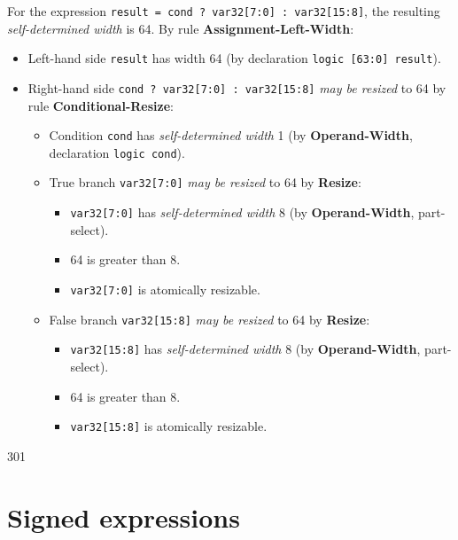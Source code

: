 \documentclass{article}
\newcommand{\sv}[1]{{\color{black}\texttt{#1}}}
\newcommand{\sds}{\emph{self-determined width}}
\newcommand{\mbr}{\emph{may be resized}}
\begin{document}
{For the expression \sv{result = cond ? var32[7:0] : var32[15:8]}, the
resulting \sds{} is 64. By rule \textbf{Assignment-Left-Width}:
\begin{itemize}
  \item Left-hand side \sv{result} has width 64 (by
    declaration \sv{logic [63:0] result}).
  \item Right-hand side \sv{cond ? var32[7:0] : var32[15:8]}
    \mbr{} to 64 by rule \textbf{Conditional-Resize}:
    \begin{itemize}
      \item Condition \sv{cond} has \sds{} 1 (by
        \textbf{Operand-Width}, declaration \sv{logic cond}).
      \item True branch \sv{var32[7:0]} \mbr{} to 64 by
        \textbf{Resize}:
        \begin{itemize}
          \item \sv{var32[7:0]} has \sds{} 8 (by
            \textbf{Operand-Width}, part-select).
          \item 64 is greater than 8.
          \item \sv{var32[7:0]} is atomically resizable.
        \end{itemize}
      \item False branch \sv{var32[15:8]} \mbr{} to 64 by
        \textbf{Resize}:
        \begin{itemize}
          \item \sv{var32[15:8]} has \sds{} 8 (by
            \textbf{Operand-Width}, part-select).
          \item 64 is greater than 8.
          \item \sv{var32[15:8]} is atomically resizable.
        \end{itemize}
    \end{itemize}
\end{itemize}
}

\renewcommand{\thesection}{11.\arabic{section}}
\setcounter{section}{6}

\begin{lrmquote}{11.7}{301}
  \section{Signed expressions}
  \textelp{}
\end{lrmquote}

\renewcommand{\thesection}{11.8.\arabic{section}}
\setcounter{section}{1}
\end{document}
